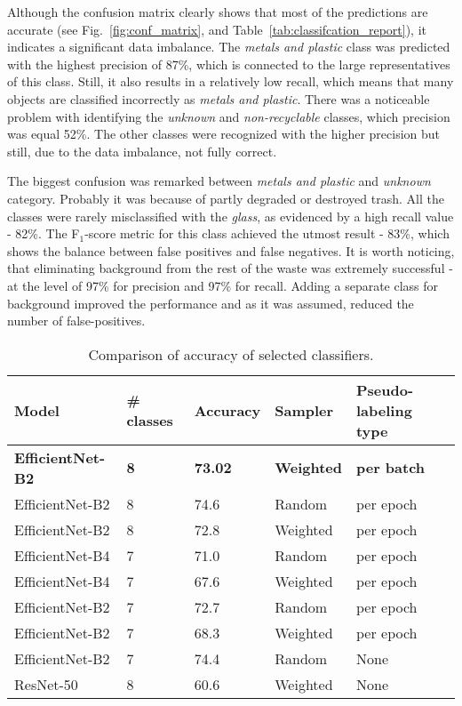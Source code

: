 \documentclass{article}
\begin{document}
Although the confusion matrix clearly shows that most of the predictions are accurate (see Fig.~\ref{fig:conf_matrix}, and Table~\ref{tab:classifcation_report}), it indicates a significant data imbalance. The \textit{metals and plastic} class was predicted with the highest precision of 87\%, which is connected to the large representatives of this class. Still, it also results in a relatively low recall, which means that many objects are classified incorrectly as \textit{metals and plastic}. There was a noticeable problem with identifying the \textit{unknown} and \textit{non-recyclable} classes, which precision was equal 52\%. The other classes were recognized with the higher precision but still, due to the data imbalance, not fully correct.

The biggest confusion was remarked between \textit{metals and plastic} and \textit{unknown} category. Probably it was because of partly degraded or destroyed trash. All the classes were rarely misclassified with the \textit{glass}, as evidenced by a high recall value - 82\%. The F$_1$-score metric for this class achieved the utmost result - 83\%, which shows the balance between false positives and false negatives. It is worth noticing, that eliminating background from the rest of the waste was extremely successful - at the level of 97\% for precision and 97\% for recall. Adding a separate class for background improved the performance and as it was assumed, reduced the number of false-positives.

{
\begin{table}[!hbt]
\centering
\caption{Comparison of accuracy of selected classifiers.}
\label{tab:classifiers_comp}
\begin{tabular}{lllll}
    \hline
        \textbf{Model} & \textbf{\# classes} & \textbf{Accuracy} & \textbf{Sampler} & \textbf{Pseudo-labeling type} \\ \hline
        \textbf{EfficientNet-B2} & \textbf{8} & \textbf{73.02} & \textbf{Weighted} & \textbf{per batch} \\
        EfficientNet-B2 & 8 & 74.6 & Random & per epoch \\
        EfficientNet-B2 & 8 & 72.8 & Weighted & per epoch \\
        EfficientNet-B4 & 7 & 71.0 & Random & per epoch \\
        EfficientNet-B4 & 7 & 67.6 & Weighted & per epoch \\
        EfficientNet-B2 & 7 & 72.7 & Random & per epoch \\
        EfficientNet-B2 & 7 & 68.3 & Weighted & per epoch \\
        EfficientNet-B2 & 7 & 74.4 & Random & None \\
        ResNet-50 & 8 & 60.6 & Weighted & None \\ \hline
    \end{tabular}
\end{table}
}
\end{document}
